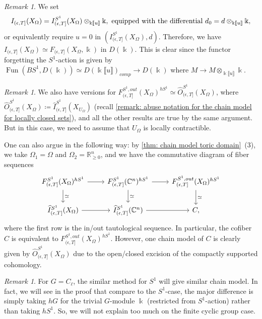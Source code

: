 \documentclass[11pt]{amsart}
\numberwithin{equation}{section}
\theoremstyle{plain}
\theoremstyle{definition}
\theoremstyle{remark}
\newtheorem{RMK}[rmk]{Remark}
\newcommand{\bC} { {\mathbb{C}}}
\newcommand{\bR} { {\mathbb{R}}}
\newcommand{\fpw}[1]{{\llbracket #1\rrbracket}}
\newcommand\Fun{\operatorname{Fun}}
\begin{document}
\begin{RMK}\label{remark: non-equivariant chain model}We set \[I_{(\epsilon,T]}(X_\Omega)=I_{(\epsilon,T]}^{S^1}(X_\Omega)\otimes_{\Bbbk\fpw{u}}\Bbbk, \textnormal{ equipped with the differential } d_0=d\otimes_{\Bbbk\fpw{u}}\Bbbk,\]
or equivalently require $u=0$ in $(I_{(\epsilon,T]}^{S^1}(X_\Omega),d)$. Therefore, we have $I_{(\epsilon,T]}(X_\Omega)\simeq F_{(\epsilon,T]}(X_\Omega,\Bbbk)$ in $D(\Bbbk)$. This is clear since the functor forgetting the $S^1$-action is given by $\Fun(BS^1,D(\Bbbk))\simeq D(\Bbbk\fpw{u})_{comp}\to D(\Bbbk)$ where $M \to M\otimes_{\Bbbk\fpw{u}}\Bbbk $.
\end{RMK}

\begin{RMK}\label{remark: in and out for chain model}We also have versions for $F_{(\epsilon,T]}^{S^1,out}(X_\Omega)^{hS^1}\simeq \widehat{O}_{(\epsilon,T]}^{S^1}(X_\Omega)$, where $\widehat{O}_{(\epsilon,T]}^{S^1}(X_\Omega)\coloneqq \widehat{I}_{(\epsilon,T]}^{S^1}(X_{U_\Omega})$ (recall \autoref{remark: abuse notation for the chain model for locally closed sets}), and all the other results are true by the same argument. But in this case, we need to assume that $U_\Omega$ is locally contractible.

One can also argue in the following way: by \autoref{thm: chain model toric domain}~(3), we take $\Omega_1=\Omega$ and $\Omega_2=\bR^n_{\geq 0}$, and we have the commutative diagram of fiber sequences
\[\begin{tikzcd}
{F_{(\epsilon,T]}^{S^1}(X_{\Omega})^{hS^1}} \arrow[r] \arrow[d, "\simeq"] & {F_{(\epsilon,T]}^{S^1}(\bC^n)^{hS^1}} \arrow[d, "\simeq"] \arrow[r] & {F_{(\epsilon,T]}^{S^1,out}(X_{\Omega})^{hS^1}} \arrow[d, "\simeq"] \\
{\widehat{I}^{S^1}_{(\epsilon,T]}(X_{\Omega})} \arrow[r]                  & {\widehat{I}^{S^1}_{(\epsilon,T]}(\bC^n)} \arrow[r]                  & C,                                                               
\end{tikzcd}\]
where the first row is the in/out tautological sequence. In particular, the cofiber $C$ is equivalent to $F_{(\epsilon,T]}^{S^1,out}(X_\Omega)^{hS^1}$. However, one chain model of $C$ is clearly given by $\widehat{O}_{(\epsilon,T]}^{S^1}(X_\Omega)$ due to the open/closed excision of the compactly supported cohomology.
\end{RMK}



\begin{RMK}For $G= C_\ell$, the similar method for $S^1$ will give similar chain model. In fact, we will see in the proof that compare to the
$S^1$-case, the major difference is simply taking $hG$ for the trivial $G$-module $\Bbbk$ (restricted from $S^1$-action) rather than taking $hS^1$. So, we will not explain too much on the finite cyclic group case.
\end{RMK}
\end{document}
